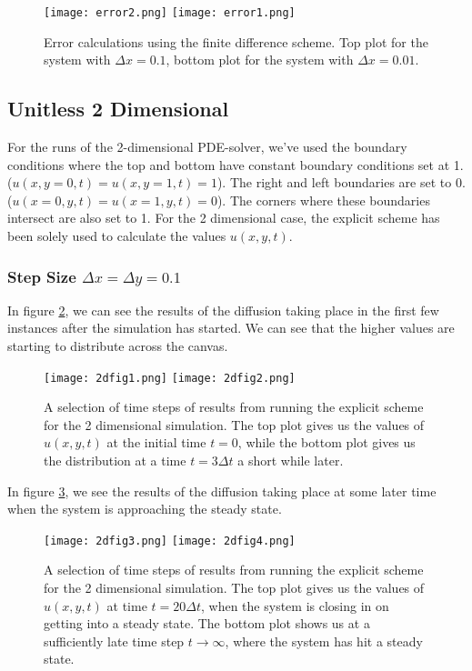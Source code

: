 \documentclass[reprint,english,notitlepage]{revtex4-1}  %
\begin{document}
\begin{figure}[h!]
    \centering
    \texttt{[image: error2.png]}
    \texttt{[image: error1.png]}
    \caption{Error calculations using the finite difference scheme. Top plot for the system with $\Delta x = 0.1$, bottom plot for the system with $\Delta x = 0.01$.}
    \label{fig:errorfigure}
\end{figure}

\newpage

\subsection{Unitless 2 Dimensional}

For the runs of the 2-dimensional PDE-solver, we've used the boundary conditions where the top and bottom have constant boundary conditions set at 1. ($u(x,y=0,t) = u(x,y=1,t) = 1$). The right and left boundaries are set to 0. ($u(x=0,y,t) = u(x=1,y,t) = 0$). The corners where these boundaries intersect are also set to 1. For the 2 dimensional case, the explicit scheme has been solely used to calculate the values $u(x,y,t)$.

\subsubsection{Step Size $\Delta x = \Delta y = 0.1$}

In figure \ref{fig:2dfigures1}, we can see the results of the diffusion taking place in the first few instances after the simulation has started. We can see that the higher values are starting to distribute across the canvas.

\begin{figure}[h!]
    \centering
    \texttt{[image: 2dfig1.png]}
    \texttt{[image: 2dfig2.png]}    
    \caption{A selection of time steps of results from running the explicit scheme for the 2 dimensional simulation. The top plot gives us the values of $u(x,y,t)$ at the initial time $t = 0$, while the bottom plot gives us the distribution at a time $t = 3\Delta t$ a short while later.}
    \label{fig:2dfigures1}
\end{figure}

In figure \ref{fig:2dfigures2}, we see the results of the diffusion taking place at some later time when the system is approaching the steady state.

\begin{figure}[h!]
    \centering
    \texttt{[image: 2dfig3.png]}
    \texttt{[image: 2dfig4.png]}    
    \caption{A selection of time steps of results from running the explicit scheme for the 2 dimensional simulation. The top plot gives us the values of $u(x,y,t)$ at time $t = 20\Delta t$, when the system is closing in on getting into a steady state. The bottom plot shows us at a sufficiently late time step $t \rightarrow \infty$, where the system has hit a steady state.}
    \label{fig:2dfigures2}
\end{figure}
\end{document}
